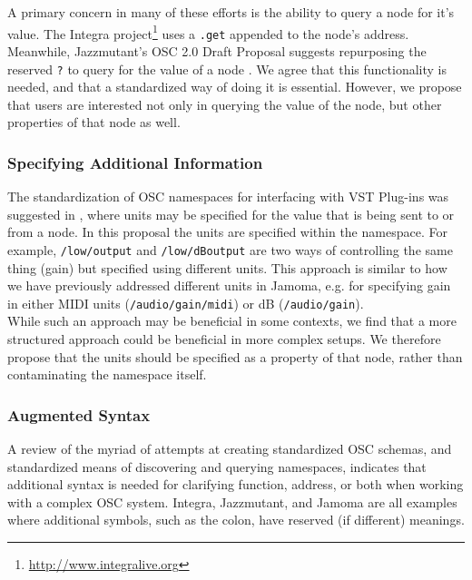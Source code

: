 \documentclass{NIME-alternate}
\begin{document}
A primary concern in many of these efforts is the ability to query a node for it's value. The Integra project\footnote{\url{http://www.integralive.org}} uses a \texttt{.get} appended to the node's address.
Meanwhile, Jazzmutant's OSC 2.0 Draft Proposal suggests repurposing the reserved \texttt{?} to query for the value of a node %
\cite{Jazzmutant:2007}. We agree that this functionality is needed, and that a standardized way of doing it is essential.  However, we propose that users are interested not only in querying the value of the node, but other properties of that node as well.

\subsubsection{Specifying Additional Information}
The standardization of OSC namespaces for interfacing with VST Plug-ins was suggested in \cite{Zbyszynski:2005}, where units may be specified for the value that is being sent to or from a node.  In this proposal the units are specified within the namespace.  For example, \texttt{/low/output} and \texttt{/low/dBoutput} are two ways of controlling the same thing (gain) but specified using different units. This approach is similar to how we have previously addressed different units in Jamoma, e.g. for specifying gain in either MIDI units (\texttt{/audio/gain/midi}) or dB (\texttt{/audio/gain}).\\ 
While such an approach may be beneficial in some contexts, we find that a more structured approach could be beneficial in more complex setups. We therefore propose that the units should be specified as a property of that node, rather than contaminating the namespace itself.

\subsubsection{Augmented Syntax}

A review of the myriad of attempts at creating standardized OSC schemas, and standardized means of discovering and querying namespaces, indicates that additional syntax is needed for clarifying function, address, or both when working with a complex OSC system.  Integra, Jazzmutant, and Jamoma are all examples where additional symbols, such as the colon, have reserved (if different) meanings.
\end{document}
